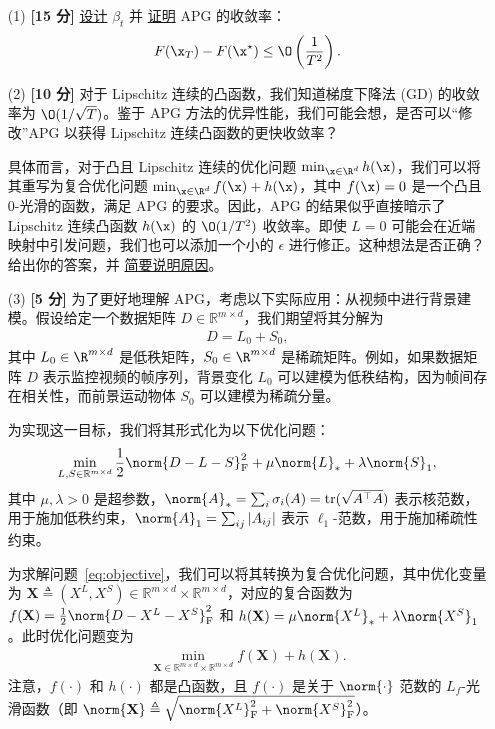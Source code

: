 \begin{enumerate}
  \item[(1)] \textbf{[15 分]} \underline{设计} $\beta_t$ 并 \underline{证明} APG 的收敛率：
  \begin{align*}
    F(\x_T) - F(\x^\star) \le \O\left(\frac{1}{T^2}\right). 
  \end{align*}
  \item[(2)] \textbf{[10 分]} 对于 Lipschitz 连续的凸函数，我们知道梯度下降法 (GD) 的收敛率为 $\O(1/\sqrt{T})$。鉴于 APG 方法的优异性能，我们可能会想，是否可以“修改”APG 以获得 Lipschitz 连续凸函数的更快收敛率？
  
  具体而言，对于凸且 Lipschitz 连续的优化问题 $\min_{\x \in \R^d} h(\x)$，我们可以将其重写为复合优化问题 $\min_{\x \in \R^d} f(\x) + h(\x)$，其中 $f(\x) = 0$ 是一个凸且 $0$-光滑的函数，满足 APG 的要求。因此，APG 的结果似乎直接暗示了 Lipschitz 连续凸函数 $h(\x)$ 的 $\O(1/T^2)$ 收敛率。即使 $L=0$ 可能会在近端映射中引发问题，我们也可以添加一个小的 $\epsilon$ 进行修正。这种想法是否正确？给出你的答案，并 \underline{简要说明原因}。
  \item[(3)] \textbf{[5 分]} 为了更好地理解 APG，考虑以下实际应用：从视频中进行背景建模。假设给定一个数据矩阵 $D\in\mathbb{R}^{m\times d}$，我们期望将其分解为
  \begin{align*}
    D = L_0 + S_0,
  \end{align*}
  其中 $L_0 \in \R^{m\times d}$ 是低秩矩阵，$S_0 \in \R^{m \times d}$ 是稀疏矩阵。例如，如果数据矩阵 $D$ 表示监控视频的帧序列，背景变化 $L_0$ 可以建模为低秩结构，因为帧间存在相关性，而前景运动物体 $S_0$ 可以建模为稀疏分量。
  
  为实现这一目标，我们将其形式化为以下优化问题：
  \begin{align}
    \label{eq:objective}
    \min_{L, S\in\mathbb{R}^{m\times d}} \frac{1}{2}\norm{D - L - S}_\text{F}^2 + \mu \norm{L}_* + \lambda \norm{S}_1,
  \end{align}
  其中 $\mu,\lambda>0$ 是超参数，$\norm{A}_*=\sum_{i}\sigma_i(A)=\text{tr}(\sqrt{A^\top A})$ 表示核范数，用于施加低秩约束，$\norm{A}_1=\sum_{ij}|A_{ij}|$ 表示 $\ell_1$-范数，用于施加稀疏性约束。
  
  为求解问题~\eqref{eq:objective}，我们可以将其转换为复合优化问题，其中优化变量为 $\mathbf{X} \triangleq (X^L, X^S)\in\mathbb{R}^{m\times d}\times \mathbb{R}^{m\times d}$，对应的复合函数为 $f(\mathbf{X})=\frac{1}{2}\norm{D - X^L - X^S}_\text{F}^2$ 和 $h(\mathbf{X})=\mu \norm{X^L}_* + \lambda \norm{X^S}_1$。此时优化问题变为
  \begin{align*}
    \min_{\mathbf{X}\in\mathbb{R}^{m\times d}\times \mathbb{R}^{m\times d}} f(\mathbf{X}) + h(\mathbf{X}).
  \end{align*}
  注意，$f(\cdot)$ 和 $h(\cdot)$ 都是凸函数，且 $f(\cdot)$ 是关于 $\norm{\cdot}$ 范数的 $L_f$-光滑函数（即 $\norm{\mathbf{X}}\triangleq\sqrt{\norm{X^L}_{\text{F}}^2+\norm{X^S}_{\text{F}}^2}$）。
  

\end{enumerate}
